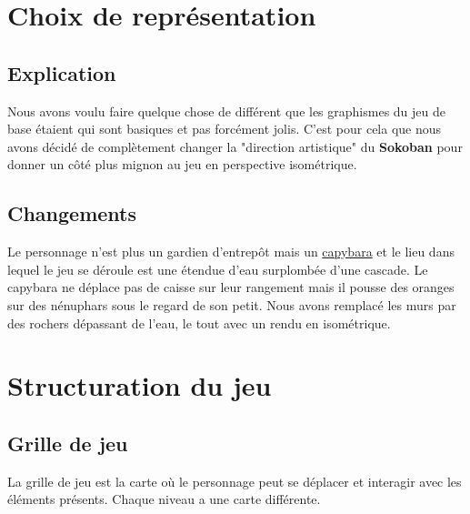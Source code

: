 \documentclass[french, 12pt]{article}
\begin{document}
\section{Choix de représentation}


   \subsection{Explication}
       Nous avons voulu faire quelque chose de différent que les graphismes du jeu de base étaient qui sont basiques et pas forcément jolis. C'est pour cela que nous avons décidé de complètement changer la "direction artistique" du \textbf{Sokoban} pour donner un côté plus mignon au jeu en perspective isométrique.


   \subsection{Changements}
       Le personnage n'est plus un gardien d'entrepôt mais un \href{https://fr.wikipedia.org/wiki/Hydrochoerus_hydrochaeris}{capybara} et le lieu dans lequel le jeu se déroule est une étendue d'eau surplombée d'une cascade. Le capybara ne déplace pas de caisse sur leur rangement mais il pousse des oranges sur des nénuphars sous le regard de son petit.
       Nous avons remplacé les murs par des rochers dépassant de l'eau, le tout avec un rendu en isométrique.


\section{Structuration du jeu}


   \label{sec:Map}
   \subsection{Grille de jeu}
       La grille de jeu est la carte où le personnage peut se déplacer et interagir avec les éléments présents. Chaque niveau a une carte différente.
\end{document}
